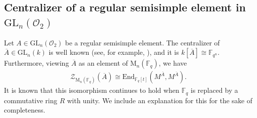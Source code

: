 \documentclass[11pt,twoside]{amsart}
\newcommand{\GL}{\mathrm{GL}}
\newcommand{\M}{\mathrm{M}}
\newcommand{\R}{\mathscr{O}_2}
\newcommand{\Fq}{\mathbb{F}_q}
\newcommand{\Zen}{\mathscr{Z}}
\theoremstyle{definition} %
\begin{document}
\subsection{Centralizer of a regular semisimple element in $\GL_n(\R)$}

Let $A \in \GL_n(\R)$ be a regular semisimple element. The centralizer of $\overline A \in \GL_n(k)$ is well known (see, for example, \cite[Theorem 2.3.11]{Singla2010}), and it is $k[\overline{A}] \cong \mathbb{F}_{q^n}$. Furthermore, viewing $\overline{A}$ as an element of $\M_n(\Fq)$, we have
\begin{align*}
\Zen_{\M_n(\Fq)}(\overline{A}) \cong \mathrm{End}_{\Fq[t]}(M^{\overline{A}}, M^{\overline{A}}).
\end{align*}
It is known that this isomorphism continues to hold when $\Fq$ is replaced by a commutative ring $R$ with unity. We include an explanation for this for the sake of completeness. 
\end{document}
